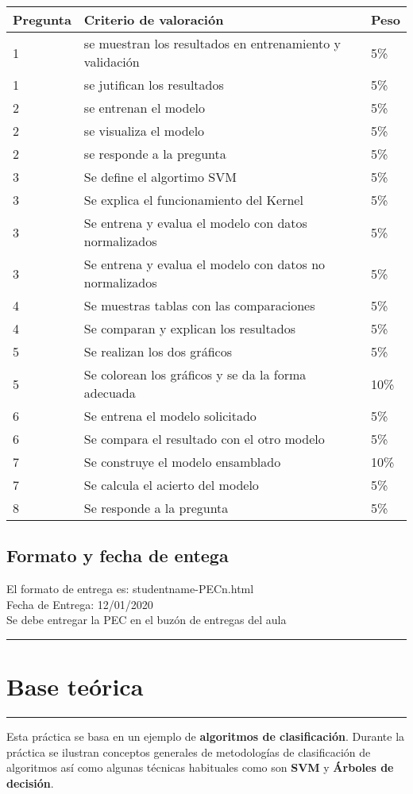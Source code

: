 \documentclass[]{article}
\begin{document}
\begin{longtable}[]{@{}lll@{}}
\toprule
Pregunta & Criterio de valoración & Peso\tabularnewline
\midrule
\endhead
1 & se muestran los resultados en entrenamiento y validación &
5\%\tabularnewline
1 & se jutifican los resultados & 5\%\tabularnewline
2 & se entrenan el modelo & 5\%\tabularnewline
2 & se visualiza el modelo & 5\%\tabularnewline
2 & se responde a la pregunta & 5\%\tabularnewline
3 & Se define el algortimo SVM & 5\%\tabularnewline
3 & Se explica el funcionamiento del Kernel & 5\%\tabularnewline
3 & Se entrena y evalua el modelo con datos normalizados &
5\%\tabularnewline
3 & Se entrena y evalua el modelo con datos no normalizados &
5\%\tabularnewline
4 & Se muestras tablas con las comparaciones & 5\%\tabularnewline
4 & Se comparan y explican los resultados & 5\%\tabularnewline
5 & Se realizan los dos gráficos & 5\%\tabularnewline
5 & Se colorean los gráficos y se da la forma adecuada &
10\%\tabularnewline
6 & Se entrena el modelo solicitado & 5\%\tabularnewline
6 & Se compara el resultado con el otro modelo & 5\%\tabularnewline
7 & Se construye el modelo ensamblado & 10\%\tabularnewline
7 & Se calcula el acierto del modelo & 5\%\tabularnewline
8 & Se responde a la pregunta & 5\%\tabularnewline
\bottomrule
\end{longtable}

\subsection{Formato y fecha de entega}\label{formato-y-fecha-de-entega}

El formato de entrega es: studentname-PECn.html\\
Fecha de Entrega: 12/01/2020\\
Se debe entregar la PEC en el buzón de entregas del aula

\begin{center}\rule{0.5\linewidth}{\linethickness}\end{center}

\section{Base teórica}\label{base-teorica}

\begin{center}\rule{0.5\linewidth}{\linethickness}\end{center}

Esta práctica se basa en un ejemplo de \textbf{algoritmos de
clasificación}. Durante la práctica se ilustran conceptos generales de
metodologías de clasificación de algoritmos así como algunas técnicas
habituales como son \textbf{SVM} y \textbf{Árboles de decisión}.
\end{document}
